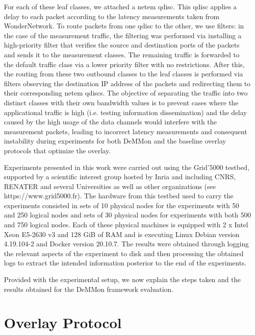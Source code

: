 For each of these leaf classes, we attached a netem qdisc. This qdisc applies a delay to each packet according to the latency measurements taken from WonderNetwork. To route packets from one qdisc to the other, we use filters: in the case of the measurement traffic, the filtering was performed via installing a high-priority filter that verifies the source and destination ports of the packets and sends it to the measurement classes. The remaining traffic is forwarded to the default traffic class via a lower priority filter with no restrictions. After this, the routing from these two outbound classes to the leaf classes is performed via filters observing the destination IP address of the packets and redirecting them to their corresponding netem qdiscs.  The objective of separating the traffic into two distinct classes with their own bandwidth values is to prevent cases where the applicational traffic is high (i.e. testing information dissemination) and the delay caused by the high usage of the data channels would interfere with the measurement packets, leading to incorrect latency measurements and consequent instability during experiments for both DeMMon and the baseline overlay protocols that optimize the overlay. 

Experiments presented in this work were carried out using the Grid'5000 testbed, supported by a scientific interest group hosted by Inria and including CNRS, RENATER and several Universities as well as other organizations (see https://www.grid5000.fr). The hardware from this testbed used to carry the experiments consisted in sets of 10 physical nodes for the experiments with 50 and 250 logical nodes and sets of 30 physical nodes for experiments with both 500 and 750 logical nodes. Each of these physical machines is equipped with 2 x Intel Xeon E5-2630 v3 and 128 GiB of RAM and is executing Linux Debian version 4.19.104-2 and Docker version 20.10.7. The results were obtained through logging the relevant aspects of the experiment to disk and then processing the obtained logs to extract the intended information posterior to the end of the experiments.

Provided with the experimental setup, we now explain the steps taken and the results obtained for the DeMMon framework evaluation.

\section{Overlay Protocol} \label{sec:overlay_proto_eval} 

